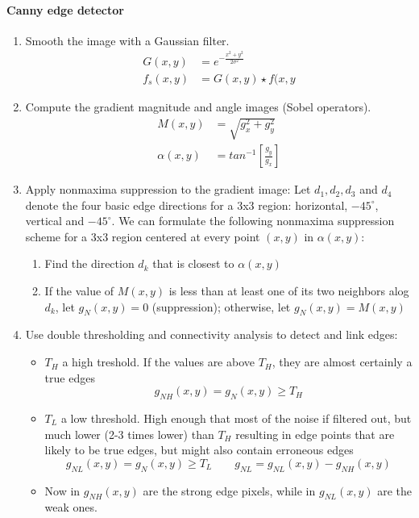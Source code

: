 \paragraph{Canny edge detector}
\begin{enumerate}
	\item Smooth the image with a Gaussian filter.
		\begin{align*}
			G(x,y)	&= e^{-\frac{x^2+y^2}{2\sigma^2}} \\
			f_s(x,y)&=G(x,y)\star f(x,y
		\end{align*}
	\item Compute the gradient magnitude and angle images (Sobel operators).
		\begin{align*}
			M(x,y) 		&= \sqrt{g_x^2+g_y^2} \\
			\alpha(x,y)	&= tan^{-1}\left[\frac{g_y}{g_x}\right]
		\end{align*}
	\item Apply nonmaxima suppression to the gradient image:
		Let $d_1, d_2, d_3$ and $d_4$ denote the four basic edge directions for a 3x3 region: horizontal, $-45^\circ$, vertical and $-45^\circ$. 
		We can formulate the following nonmaxima suppression scheme for a 3x3 region centered at every point $(x,y)$ in $\alpha(x,y)$:
		\begin{enumerate}
			\item Find the direction $d_k$ that is closest to $\alpha(x,y)$
			\item If the value of $M(x,y)$ is less than at least one of its two neighbors alog $d_k$, let $g_N(x,y) = 0$ (suppression); otherwise, let $g_N(x,y) = M(x,y)$
		\end{enumerate}
	\item Use double thresholding and connectivity analysis to detect and link edges:
		\begin{itemize}
			\item $T_H$ a high treshold. If the values are above $T_H$, they are almost certainly a true edges
				\[
					g_{NH}(x,y) = g_N(x,y) \geq T_H
				\]
			\item $T_L$ a low threshold. High enough that most of the noise if filtered out, but much lower (2-3 times lower) than $T_H$ resulting in edge points that are likely to be true edges, but might also contain erroneous edges
				\[
					g_{NL}(x,y) = g_N(x,y) \geq T_L \qquad g_{NL} = g_{NL}(x,y) - g_{NH}(x,y)
				\]
			\item Now in $g_{NH}(x,y)$ are the strong edge pixels, while in $g_{NL}(x,y)$ are the weak ones.

\end{itemize}
\end{enumerate}
